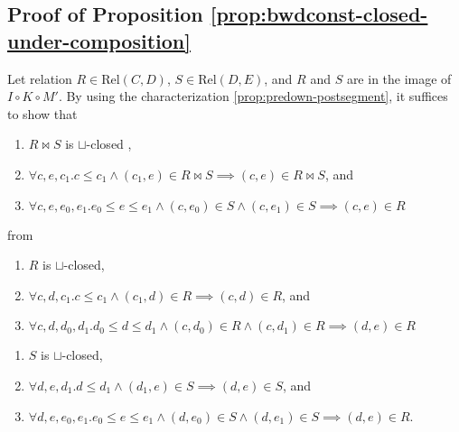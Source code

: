 \documentclass{llncs}
\newcommand{\Rel}{\mathrm{Rel}}
\newcommand{\join}{\sqcup}
\newcommand{\comp}{\circ}
\begin{document}
\subsection{Proof of Proposition \ref{prop:bwdconst-closed-under-composition}}
Let relation $R \in \Rel(C, D)$, $S \in \Rel(D , E)$, and $R$ and $S$ are in the image of $I \comp K \comp M'$.
By using the characterization \ref{prop:predown-postsegment}, it suffices to show that
\begin{enumerate}[i]
  \item $R \bowtie S$ is $\join$-closed \label{i},
  \item $\forall c, e , c_{1}. c \leq c_{1} \land (c_{1} , e) \in R \bowtie S \implies (c , e) \in R \bowtie S$, and \label{ii}
  \item $\forall c, e , e_{0}, e_{1}. e_{0} \leq e \leq e_{1} \land (c , e_{0}) \in S \land (c , e_{1}) \in S \implies (c , e) \in R$ \label{iii}
\end{enumerate}
from
\begin{enumerate}[]
  \item $R$ is $\join$-closed,
  \item $\forall c, d , c_{1}. c \leq c_{1} \land (c_{1} , d) \in R \implies (c , d) \in R$, and
  \item $\forall c, d , d_{0}, d_{1}. d_{0} \leq d \leq d_{1} \land (c , d_{0}) \in R \land (c , d_{1}) \in R \implies (d , e) \in R$
\end{enumerate}
\begin{enumerate}[]
  \item $S$ is $\join$-closed,
  \item $\forall d, e , d_{1}. d \leq d_{1} \land (d_{1} , e) \in S \implies (d , e) \in S$, and
  \item $\forall d, e , e_{0}, e_{1}. e_{0} \leq e \leq e_{1} \land (d , e_{0}) \in S \land (d , e_{1}) \in S \implies (d , e) \in R$.
\end{enumerate}
\end{document}
